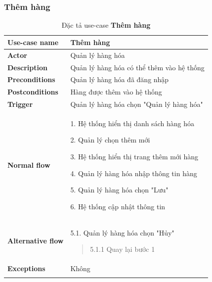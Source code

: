 \subsubsection{Thêm hàng}
{
    \setlength\extrarowheight{6pt}
    \begin{longtable}{| p{} | p{} |}
        \hline
        \textbf{Use-case name}
         &
        Thêm hàng
        \\
        \hline
        \textbf{Actor}
         &
        Quản lý hàng hóa
        \\
        \hline
        \textbf{Description}
         &
        Quản lý hàng hóa có thể thêm vào hệ thống
        \\
        \hline
        \textbf{Preconditions}
         &
        Quản lý hàng hóa đã đăng nhập
        \\
        \hline
        \textbf{Postconditions}
         &
        Hàng được thêm vào hệ thống
        \\
        \hline
        \textbf{Trigger}
         &
        Quản lý hàng hóa chọn "Quản lý hàng hóa"
        \\
        \hline
        \begin{flushleft}
            \textbf{Normal flow}
        \end{flushleft}
         &
        1. Hệ thống hiển thị danh sách hàng hóa

        2. Quản lý chọn thêm mới

        3. Hệ thống hiển thị trang thêm mới hàng

        4. Quản lý hàng hóa nhập thông tin hàng

        5. Quản lý hàng hóa chọn "Lưu"

        6. Hệ thống cập nhật thông tin
        \\
        \hline
        \begin{flushleft}
            \textbf{Alternative flow}
        \end{flushleft}
         &
        5.1. Quản lý hàng hóa chọn "Hủy"
        \begin{quote}

            5.1.1 Quay lại bước 1
        \end{quote}
        \\
        \hline
        \textbf{Exceptions}
         &
        Không
        \\
        \hline
        \caption{Đặc tả use-case \textbf{Thêm hàng}}
    \end{longtable}
}

